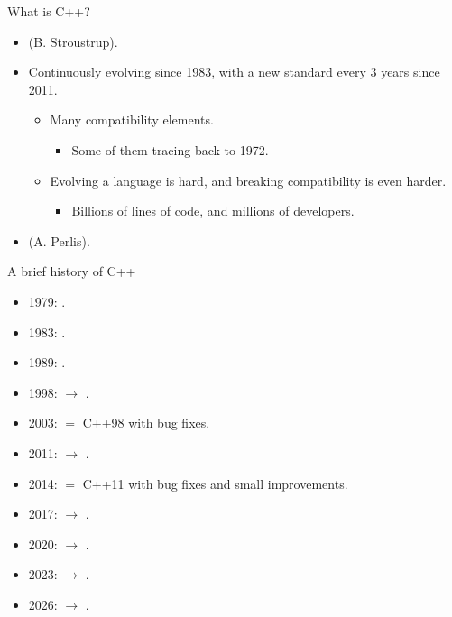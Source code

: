 \begin{frame}[t,fragile]{What is C++?}
\begin{itemize}
  \item {} (B. Stroustrup).
  
  \item Continuously evolving since 1983, with a new standard every 3 years since 2011.
    \begin{itemize}
      \item Many compatibility elements.
        \begin{itemize}
          \item Some of them tracing back to 1972.
        \end{itemize}
      \item Evolving a language is hard, and breaking compatibility is even harder.
        \begin{itemize}
          \item Billions of lines of code, and millions of developers.
        \end{itemize}
    \end{itemize}

    \item {} (A. Perlis).
\end{itemize}
\end{frame}


\begin{frame}[t,fragile]{A brief history of C++}
\begin{itemize}
  \item 1979: .
  \item 1983: .
  \item 1989: .
  \item 1998:  $\rightarrow$ .
  \item 2003:  $=$ C++98 with bug fixes.
  \item 2011:  $\rightarrow$ .
  \item 2014:  $=$ C++11 with bug fixes and small improvements.
  \item 2017:  $\rightarrow$ .
  \item 2020:  $\rightarrow$ .
  \item 2023:  $\rightarrow$ .
  \item 2026:  $\rightarrow$ .
\end{itemize}
\end{frame}

